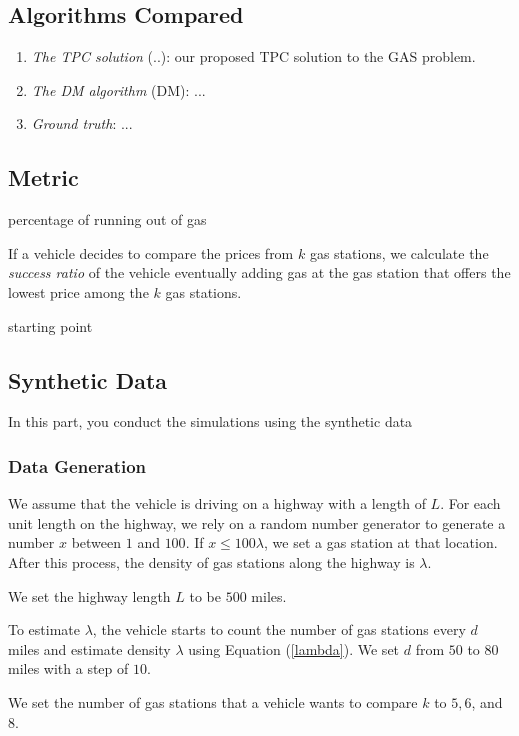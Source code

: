\documentclass[conference]{IEEEtran}
\theoremstyle{definition}
\begin{document}
\subsection{Algorithms Compared}
\begin{enumerate}
\item {\em The TPC solution} (..): our proposed TPC solution to the GAS problem.
\item {\em The DM algorithm} (DM):  ...
\item {\em Ground truth}: ...
\end{enumerate}

\subsection{Metric}
{\color{red} percentage of running out of gas}

If a vehicle decides to compare the prices from $k$ gas stations, we calculate the {\em success ratio} of the vehicle eventually adding gas at the gas station that offers the lowest price among the $k$ gas stations.

{\color{red} starting point}

\subsection{Synthetic Data}
{\color{red} In this part, you conduct the simulations using the synthetic data}

\subsubsection{Data Generation}

We assume that the vehicle is driving on a highway with a length of $L$. For each unit length on the highway,  we rely on a random number generator to generate a number $x$ between $1$ and $100$. If $x \leq 100\lambda$, we set a gas station at that location. After this process, the density of gas stations along the highway is $\lambda$.

We set the highway length $L$ to be $500$ miles.

To estimate $\lambda$, the vehicle starts to count the number of gas stations every $d$ miles and estimate  density $\lambda$ using Equation (\ref{lambda}). We set $d$ from $50$ to $80$ miles with a step of $10$.

We set the number of gas stations that a vehicle wants to compare $k$ to $5, 6$, and $8$.
\end{document}
